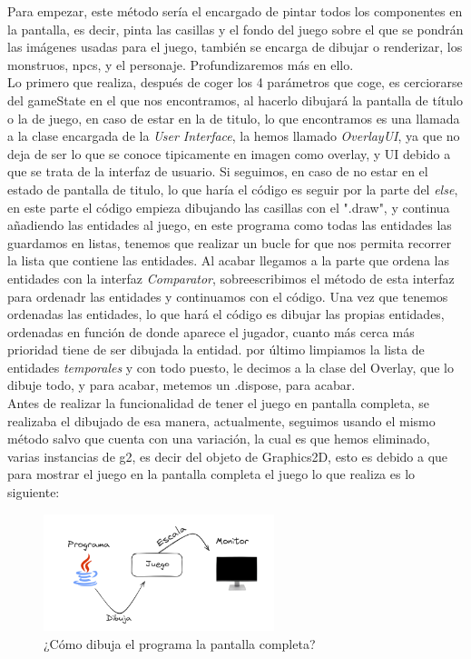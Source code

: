\documentclass[a4paper]{article}
\begin{document}
Para empezar, este método sería el encargado de pintar todos los componentes en la pantalla, es decir, pinta las casillas y el fondo del juego sobre el que se pondrán las imágenes usadas para el juego,
también se encarga de dibujar o renderizar, los monstruos, npcs, y el personaje. Profundizaremos más en ello.\\
Lo primero que realiza, después de coger los 4 parámetros que coge, es cerciorarse del gameState en el que nos encontramos, al hacerlo dibujará la pantalla de título o la de juego, en caso de estar en la
de titulo, lo que encontramos es una llamada a la clase encargada de la \textit{User Interface}, la hemos llamado \textit{OverlayUI}, ya que no deja de ser lo que se conoce tipicamente en imagen como overlay,
y UI debido a que se trata de la interfaz de usuario. Si seguimos, en caso de no estar en el estado de pantalla de titulo, lo que haría el código es seguir por la parte del \textit{else}, en este parte el código empieza
dibujando las casillas con el ".draw", y continua añadiendo las entidades al juego, en este programa como todas las entidades las guardamos en listas, tenemos que realizar un bucle for que nos permita recorrer la lista
que contiene las entidades. Al acabar llegamos a la parte que ordena las entidades con la interfaz \textit{Comparator}, sobreescribimos el método de esta interfaz para ordenadr las entidades y continuamos con el código.
Una vez que tenemos ordenadas las entidades, lo que hará el código es dibujar las propias entidades, ordenadas en función de donde aparece el jugador, cuanto más cerca más prioridad tiene de ser dibujada la entidad.
por último limpiamos la lista de entidades \textit{temporales} y con todo puesto, le decimos a la clase del Overlay, que lo dibuje todo, y para acabar, metemos un .dispose, para acabar. \\
Antes de realizar la funcionalidad de tener el juego en pantalla completa, se realizaba el dibujado de esa manera, actualmente, seguimos usando el mismo método salvo que cuenta con una variación, la cual es que hemos eliminado,
varias instancias de g2, es decir del objeto de Graphics2D, esto es debido a que para mostrar el juego en la pantalla completa el juego lo que realiza es lo siguiente:\\
\begin{figure}[ht]
    \centering
    \includegraphics[width=0.6\textwidth]{Images/Fullscrennmode.PNG}
    \caption{¿Cómo dibuja el programa la pantalla completa?}
    \label{fig:fullscreenmode}
\end{figure}
\end{document}
